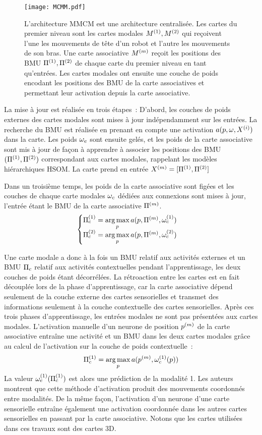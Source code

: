 \documentclass[../main]{subfiles}
\begin{document}
\begin{figure}[t]
    \centering
    \texttt{[image: MCMM.pdf]}
    \caption{L'architecture MMCM \parencite{dominey13} est une architecture centralisée.
    Les cartes du premier niveau sont les cartes modales $M^{({1})}, M^{({2})}$ qui reçoivent l'une les mouvements de tête d'un robot et l'autre les mouvements de son bras.
    Une carte associative $M^{({m})}$ reçoit les positions des BMU $\Pi^{({1})},\Pi^{({2})}$ de chaque carte du premier niveau en tant qu'entrées. 
    Les cartes modales ont ensuite une couche de poids encodant les positions des BMU de la carte associatives et permettant leur activation depuis la carte associative.
    \label{fig:mmcm}}
\end{figure}

La mise à jour est réalisée en trois étapes~: 
D'abord, les couches de poids externes des cartes modales sont mises à jour indépendamment sur les entrées. La recherche du BMU est réalisée en prenant en compte une activation $a(p, \omega, X^{({i})})$ dans la carte.
Les poids $\omega_e$ sont ensuite gelés, et les poids de la carte associative sont mis à jour de façon à apprendre à associer les positions des BMU $(\Pi^{({1})},\Pi^{({2})})$ correspondant aux cartes modales, rappelant les modèles hiérarchiques HSOM. La carte prend en entrée $X^{({m})} = [\Pi^{({1})}, \Pi^{({2})}]$

Dans un troisième temps, les poids de la carte associative sont figées et les couches de chaque carte modales $\omega_c$ dédiées aux connexions sont mises à jour, l'entrée étant le BMU de la carte associative $\Pi^{({m})}$.
\begin{equation*}
    \begin{cases}
        \Pi_c^{({1})} = \operatorname*{arg\,max}\limits_p a(p, \Pi^{({m})}, \omega_c^{({1})})\\
        \Pi_c^{({2})} = \operatorname*{arg\,max}\limits_p a(p, \Pi^{({m})}, \omega_c^{({2})})
    \end{cases}
    \end{equation*}

Une carte modale a donc à la fois un BMU relatif aux activités externes et un BMU $\Pi_c$ relatif aux activités contextuelles pendant l'apprentissage, les deux couches de poids étant décorrélées.
La rétroaction entre les cartes est en fait découplée lors de la phase d'apprentissage, car la carte associative dépend seulement de la couche externe des cartes sensorielles et transmet des informations seulement à la couche contextuelle des cartes sensorielles.
Après ces trois phases d'apprentissage, les entrées modales ne sont pas présentées aux cartes modales. L'activation manuelle d'un neurone de position $p^{({m})}$ de la carte associative entraîne une activité et un BMU dans les deux cartes modales grâce au calcul de l'activation sur la couche de poids contextuelle~: 
$$ \Pi_c^{({1})} = \operatorname*{arg\,max}\limits_p a(p^{({m})},\omega_c^{({1})}(p))$$
La valeur $\omega_e^{({1})}(\Pi_c^{({1})})$ est alors une prédiction de la modalité 1.
Les auteurs montrent que cette méthode d'activation produit des mouvements coordonnés entre modalités.
De la même façon, l'activation d'un neurone d'une carte sensorielle entraîne également une activation coordonnée dans les autres cartes sensorielles en passant par la carte associative.
Notons que les cartes utilisées dans ces travaux sont des cartes 3D.
\end{document}
